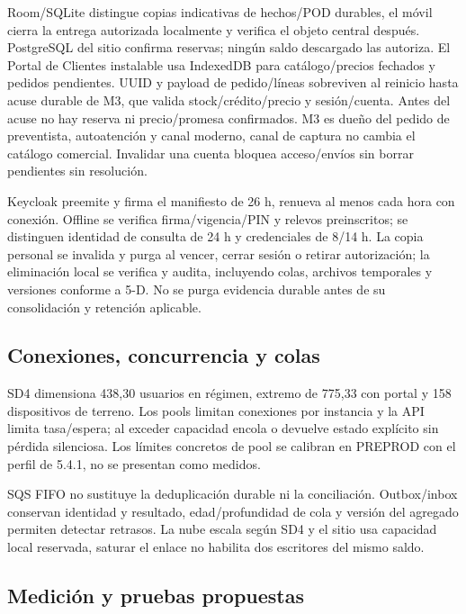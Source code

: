 Room/SQLite distingue copias indicativas de hechos/POD durables, el móvil cierra la entrega autorizada localmente y verifica el objeto central después. PostgreSQL del sitio confirma reservas; ningún saldo descargado las autoriza. El Portal de Clientes instalable usa IndexedDB para catálogo/precios fechados y pedidos pendientes. UUID y payload de pedido/líneas sobreviven al reinicio hasta acuse durable de M3, que valida stock/crédito/precio y sesión/cuenta. Antes del acuse no hay reserva ni precio/promesa confirmados. M3 es dueño del pedido de preventista, autoatención y canal moderno, canal de captura no cambia el catálogo comercial. Invalidar una cuenta bloquea acceso/envíos sin borrar pendientes sin resolución.

Keycloak preemite y firma el manifiesto de 26 h, renueva al menos cada hora con conexión. Offline se verifica firma/vigencia/PIN y relevos preinscritos; se distinguen identidad de consulta de 24 h y credenciales de 8/14 h. La copia personal se invalida y purga al vencer, cerrar sesión o retirar autorización; la eliminación local se verifica y audita, incluyendo colas, archivos temporales y versiones conforme a 5-D. No se purga evidencia durable antes de su consolidación y retención aplicable.

\subsection{Conexiones, concurrencia y colas}
\label{sec:sd5-5-4-5}

SD4 dimensiona 438,30 usuarios en régimen, extremo de 775,33 con portal y 158 dispositivos de terreno. Los pools limitan conexiones por instancia y la API limita tasa/espera; al exceder capacidad encola o devuelve estado explícito sin pérdida silenciosa. Los límites concretos de pool se calibran en PREPROD con el perfil de 5.4.1, no se presentan como medidos.

SQS FIFO no sustituye la deduplicación durable ni la conciliación. Outbox/inbox conservan identidad y resultado, edad/profundidad de cola y versión del agregado permiten detectar retrasos. La nube escala según SD4 y el sitio usa capacidad local reservada, saturar el enlace no habilita dos escritores del mismo saldo.

\subsection{Medición y pruebas propuestas}
\label{sec:sd5-5-4-6}

